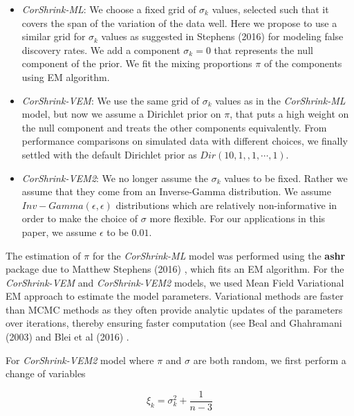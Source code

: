 \begin{itemize}

\item \textit{CorShrink-ML}:  We choose a fixed grid of $\sigma_k$ values, selected such that it covers the span of the variation of the data well. Here we propose to use a similar grid for $\sigma_k$ values as suggested in Stephens (2016) \cite{Stephens2016} for modeling false discovery rates. We add a component  $\sigma_k=0$ that represents the null component of the prior. We fit the mixing proportions $\pi$ of the components using EM algorithm. 

\item \textit{CorShrink-VEM}: We use the same grid of $\sigma_k$ values as in the \textit{CorShrink-ML} model, but now we assume a Dirichlet prior on $\pi$, that puts a high weight on the null component and treats the other components equivalently. From performance comparisons on simulated data  with different choices, we finally settled with the default Dirichlet prior as $Dir(10, 1, ,1, \cdots, 1)$. 

\item \textit{CorShrink-VEM2}: We no longer assume the $\sigma_k$ values to be fixed. Rather we assume that they come from an Inverse-Gamma distribution. We assume $Inv-Gamma(\epsilon, \epsilon)$ distributions which are relatively non-informative in order to make the choice of $\sigma$ more flexible. For our applications in this paper, we assume $\epsilon$ to be $0.01$.

\end{itemize}

The estimation of $\pi$ for the \textit{CorShrink-ML} model was performed using the \textbf{ashr} package due to Matthew Stephens (2016) \cite{Stephens2016}, which fits an EM algorithm. For the \textit{CorShrink-VEM} and \textit{CorShrink-VEM2} models, we used Mean Field Variational EM approach to estimate the model parameters. Variational methods are faster than MCMC methods as they often provide analytic updates of the parameters over iterations, thereby ensuring faster computation (see Beal and Ghahramani (2003) \cite{Beal2003} and Blei et al (2016) \cite{Blei2016}.

For \textit{CorShrink-VEM2} model where $\pi$ and $\sigma$ are both random, we first perform a change of variables 

\begin{equation}
\xi_{k} = \sigma^2_{k} + \frac{1}{n-3} 
\end{equation}

